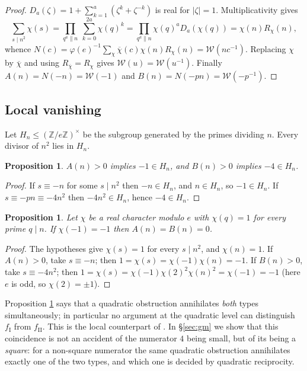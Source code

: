 \documentclass[11pt,reqno]{amsart}
\theoremstyle{plain}
\newtheorem{proposition}[theorem]{Proposition}
\theoremstyle{definition}
\numberwithin{equation}{section}
\newcommand{\Z}{\mathbb{Z}}
\newcommand{\fI}{f_{\mathrm{I}}}
\newcommand{\fII}{f_{\mathrm{II}}}
\begin{document}
\begin{proof}
$D_{a}(\zeta)=1+\sum_{k=1}^{a}(\zeta^{k}+\zeta^{-k})$ is real for $|\zeta|=1$.
Multiplicativity gives
\[
  \sum_{s\mid n^{2}}\chi(s)=\prod_{q^{a}\|n}\ \sum_{k=0}^{2a}\chi(q)^{k}
  =\prod_{q^{a}\|n}\chi(q)^{a}D_{a}(\chi(q))=\chi(n)R_{\chi}(n),
\]
whence $N(c)=\varphi(e)^{-1}\sum_{\chi}\overline\chi(c)\chi(n)R_{\chi}(n)
=\mathcal W(nc^{-1})$.
Replacing $\chi$ by $\overline\chi$ and using $R_{\overline\chi}=R_{\chi}$ gives
$\mathcal W(u)=\mathcal W(u^{-1})$. Finally $A(n)=N(-n)=\mathcal W(-1)$ and
$B(n)=N(-pn)=\mathcal W(-p^{-1})$.
\end{proof}

\subsection{Local vanishing}
Let $H_{n}\le(\Z/e\Z)^{\times}$ be the subgroup generated by the primes dividing $n$.
Every divisor of $n^{2}$ lies in $H_{n}$.

\begin{proposition}\label{prop:group}
$A(n)>0$ implies $-1\in H_{n}$, and $B(n)>0$ implies $-4\in H_{n}$.
\end{proposition}

\begin{proof}
If $s\equiv-n$ for some $s\mid n^{2}$ then $-n\in H_{n}$, and $n\in H_{n}$, so
$-1\in H_{n}$. If $s\equiv-pn\equiv-4n^{2}$ then $-4n^{2}\in H_{n}$, hence
$-4\in H_{n}$.
\end{proof}

\begin{proposition}\label{prop:quad}
Let $\chi$ be a real character modulo $e$ with $\chi(q)=1$ for every prime $q\mid n$.
If $\chi(-1)=-1$ then $A(n)=B(n)=0$.
\end{proposition}

\begin{proof}
The hypotheses give $\chi(s)=1$ for every $s\mid n^{2}$, and $\chi(n)=1$. If
$A(n)>0$, take $s\equiv-n$; then $1=\chi(s)=\chi(-1)\chi(n)=-1$. If $B(n)>0$, take
$s\equiv-4n^{2}$; then $1=\chi(s)=\chi(-1)\chi(2)^{2}\chi(n)^{2}=\chi(-1)=-1$
(here $e$ is odd, so $\chi(2)=\pm1$).
\end{proof}

Proposition \ref{prop:quad} says that a quadratic obstruction annihilates
\emph{both} types simultaneously; in particular no argument at the quadratic level
can distinguish $\fI$ from $\fII$. This is the local counterpart of
\cite[Prop.~1.6]{ElsholtzTao}. In \S\ref{sec:gm} we show that this coincidence is
not an accident of the numerator $4$ being small, but of its being a \emph{square}:
for a non-square numerator the same quadratic obstruction annihilates exactly one of
the two types, and which one is decided by quadratic reciprocity.
\end{document}
